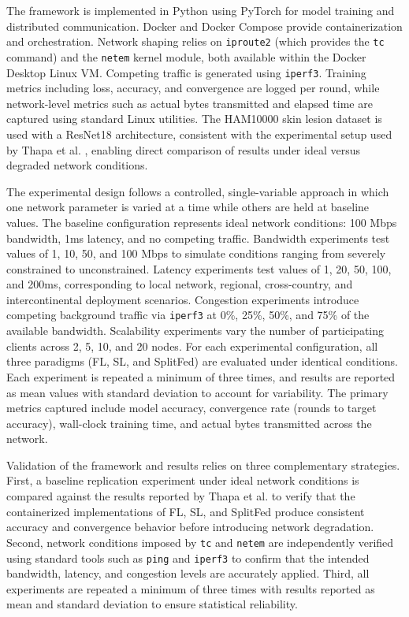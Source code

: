 \documentclass[12pt]{article}
\begin{document}
The framework is implemented in Python using PyTorch for model training and distributed communication. Docker and Docker Compose provide containerization and orchestration. Network shaping relies on \texttt{iproute2} (which provides the \texttt{tc} command) and the \texttt{netem} kernel module, both available within the Docker Desktop Linux VM. Competing traffic is generated using \texttt{iperf3}. Training metrics including loss, accuracy, and convergence are logged per round, while network-level metrics such as actual bytes transmitted and elapsed time are captured using standard Linux utilities. The HAM10000 skin lesion dataset is used with a ResNet18 architecture, consistent with the experimental setup used by Thapa et al. \cite{thapa2022}, enabling direct comparison of results under ideal versus degraded network conditions.

The experimental design follows a controlled, single-variable approach in which one network parameter is varied at a time while others are held at baseline values. The baseline configuration represents ideal network conditions: 100 Mbps bandwidth, 1ms latency, and no competing traffic. Bandwidth experiments test values of 1, 10, 50, and 100 Mbps to simulate conditions ranging from severely constrained to unconstrained. Latency experiments test values of 1, 20, 50, 100, and 200ms, corresponding to local network, regional, cross-country, and intercontinental deployment scenarios. Congestion experiments introduce competing background traffic via \texttt{iperf3} at 0\%, 25\%, 50\%, and 75\% of the available bandwidth. Scalability experiments vary the number of participating clients across 2, 5, 10, and 20 nodes. For each experimental configuration, all three paradigms (FL, SL, and SplitFed) are evaluated under identical conditions. Each experiment is repeated a minimum of three times, and results are reported as mean values with standard deviation to account for variability. The primary metrics captured include model accuracy, convergence rate (rounds to target accuracy), wall-clock training time, and actual bytes transmitted across the network.

Validation of the framework and results relies on three complementary strategies. First, a baseline replication experiment under ideal network conditions is compared against the results reported by Thapa et al. \cite{thapa2022} to verify that the containerized implementations of FL, SL, and SplitFed produce consistent accuracy and convergence behavior before introducing network degradation. Second, network conditions imposed by \texttt{tc} and \texttt{netem} are independently verified using standard tools such as \texttt{ping} and \texttt{iperf3} to confirm that the intended bandwidth, latency, and congestion levels are accurately applied. Third, all experiments are repeated a minimum of three times with results reported as mean and standard deviation to ensure statistical reliability.
\end{document}

